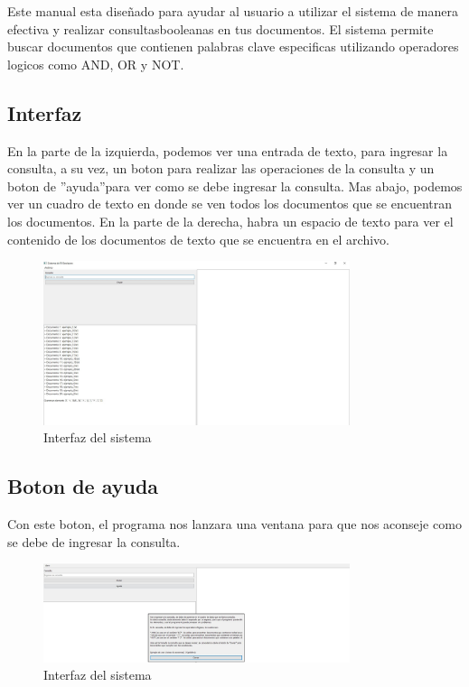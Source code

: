Este manual esta diseñado para ayudar al usuario a utilizar el sistema de manera efectiva y realizar consultasbooleanas en tus documentos. El sistema permite buscar documentos que contienen palabras clave especificas
utilizando operadores logicos como AND, OR y NOT.
\subsection{Interfaz}
En la parte de la izquierda, podemos ver una entrada de texto, para ingresar la consulta, a su vez, un
boton para realizar las operaciones de la consulta y un boton de ”ayuda”para ver como se debe ingresar
la consulta. Mas abajo, podemos ver un cuadro de texto en donde se ven todos los documentos que se
encuentran los documentos.
En la parte de la derecha, habra un espacio de texto para ver el contenido de los documentos de texto que
se encuentra en el archivo.
\begin{figure}[ht]
  \centering
  \includegraphics[width=0.8\textwidth]{src/img/ejecucion/1.jpg}
  \caption{Interfaz del sistema}
\end{figure}
\subsection*{Boton de ayuda}
Con este boton, el programa nos lanzara una ventana para que nos aconseje como se debe de ingresar la
consulta.
\begin{figure}[ht]
  \centering
  \includegraphics[width=0.8\textwidth]{src/img/ejecucion/2.jpg}
  \caption{Interfaz del sistema}
\end{figure}
